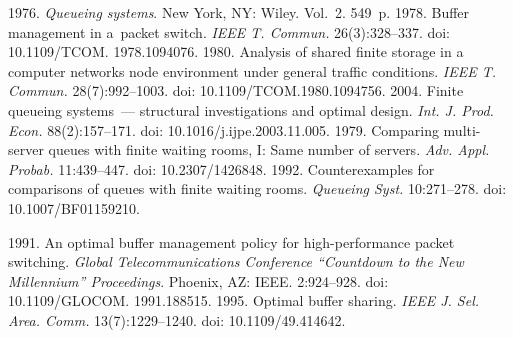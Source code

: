 


  

\vspace*{4pt}

  \begin{multicols}{2}

\renewcommand{\bibname}{\protect\rmfamily References}

{\small\frenchspacing
 {%
 \begin{thebibliography}{99} 
 
 \vspace*{-2pt}
 
 1976. \textit{Queueing systems}. New York, NY: 
Wiley. Vol.~2. 549~p.
 1978. Buffer management in a~packet switch. \textit{IEEE T. Commun.} 26(3):328--337. 
doi: 10.1109/TCOM. 1978.1094076.
 1980. Analysis of shared finite storage in a computer networks node 
environment under general traffic conditions. \textit{IEEE T. Commun.} 28(7):992--1003. doi: 
10.1109/TCOM.1980.1094756.
 2004. Finite queueing systems~--- structural investigations and optimal 
design.  \textit{Int. J. Prod. Econ.} 88(2):157--171. doi: 10.1016/j.ijpe.2003.11.005.
 1979. Comparing multi-server queues with finite waiting rooms, I: Same number of 
servers. \textit{Adv. Appl. Probab.} 11:439--447. doi: 10.2307/1426848.
 1992. Counterexamples for comparisons of queues with finite waiting rooms. 
\textit{Queueing Syst.} 10:271--278. doi: 10.1007/BF01159210.

 1991. An optimal buffer management policy for high-performance 
packet switching. \textit{Global Telecommunications Conference ``Countdown to the New Millennium'' Proceedings}. 
Phoenix, AZ: IEEE. 2:924--928. doi: 10.1109/\mbox{GLOCOM}. 1991.188515.
 1995. Optimal buffer sharing. \textit{IEEE J. 
Sel. Area. Comm.} 13(7):1229--1240. doi: 10.1109/49.414642.


\end{thebibliography}}}
\end{multicols}
